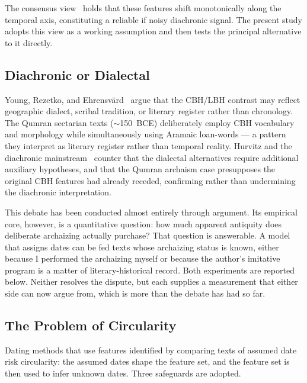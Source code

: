 \documentclass[10pt,letterpaper]{article}
\newcommand{\cbh}{CBH}
\begin{document}
The consensus
view~\cite{Hurvitz1982,Hurvitz2014,Robertson1972,Schniedewind2004} holds that
these features shift monotonically along the temporal axis, constituting a
reliable if noisy diachronic signal.  The present study adopts this view as a
working assumption and then tests the principal alternative to it directly.

\subsection*{Diachronic or Dialectal}

Young, Rezetko, and Ehrensv\"{a}rd~\cite{Young2008} argue that the CBH/LBH
contrast may reflect geographic dialect, scribal tradition, or literary
register rather than chronology.  The Qumran sectarian texts
($\sim$150~BCE) deliberately employ \cbh{} vocabulary and morphology while
simultaneously using Aramaic loan-words --- a pattern they interpret as
literary register rather than temporal reality.  Hurvitz and the diachronic
mainstream~\cite{Hurvitz1997} counter that the dialectal alternatives require
additional auxiliary hypotheses, and that the Qumran archaism case
presupposes the original \cbh{} features had already receded, confirming
rather than undermining the diachronic interpretation.

This debate has been conducted almost entirely through argument.  Its empirical
core, however, is a quantitative question: how much apparent antiquity does
deliberate archaizing actually purchase?  That question is answerable.  A model
that assigns dates can be fed texts whose archaizing status is known, either
because I performed the archaizing myself or because the author's
imitative program is a matter of literary-historical record.  Both experiments
are reported below.  Neither resolves the dispute, but each supplies a
measurement that either side can now argue from, which is more than the debate
has had so far.

\subsection*{The Problem of Circularity}

Dating methods that use features identified by comparing texts of assumed date
risk circularity: the assumed dates shape the feature set, and the feature set
is then used to infer unknown dates.  Three safeguards are adopted.
\end{document}
